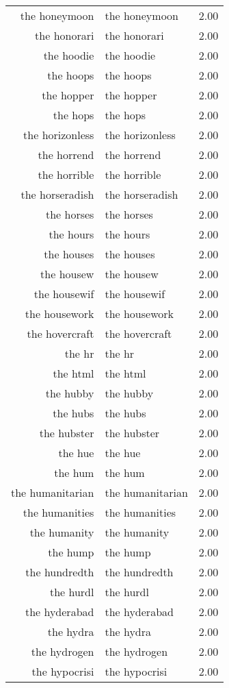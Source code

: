 \begin{table}[ht]
\begin{tabular}{rlr}
  the honeymoon & the honeymoon & 2.00 \\ 
  the honorari & the honorari & 2.00 \\ 
  the hoodie & the hoodie & 2.00 \\ 
  the hoops & the hoops & 2.00 \\ 
  the hopper & the hopper & 2.00 \\ 
  the hops & the hops & 2.00 \\ 
  the horizonless & the horizonless & 2.00 \\ 
  the horrend & the horrend & 2.00 \\ 
  the horrible & the horrible & 2.00 \\ 
  the horseradish & the horseradish & 2.00 \\ 
  the horses & the horses & 2.00 \\ 
  the hours & the hours & 2.00 \\ 
  the houses & the houses & 2.00 \\ 
  the housew & the housew & 2.00 \\ 
  the housewif & the housewif & 2.00 \\ 
  the housework & the housework & 2.00 \\ 
  the hovercraft & the hovercraft & 2.00 \\ 
  the hr & the hr & 2.00 \\ 
  the html & the html & 2.00 \\ 
  the hubby & the hubby & 2.00 \\ 
  the hubs & the hubs & 2.00 \\ 
  the hubster & the hubster & 2.00 \\ 
  the hue & the hue & 2.00 \\ 
  the hum & the hum & 2.00 \\ 
  the humanitarian & the humanitarian & 2.00 \\ 
  the humanities & the humanities & 2.00 \\ 
  the humanity & the humanity & 2.00 \\ 
  the hump & the hump & 2.00 \\ 
  the hundredth & the hundredth & 2.00 \\ 
  the hurdl & the hurdl & 2.00 \\ 
  the hyderabad & the hyderabad & 2.00 \\ 
  the hydra & the hydra & 2.00 \\ 
  the hydrogen & the hydrogen & 2.00 \\ 
  the hypocrisi & the hypocrisi & 2.00 \\ 

\end{tabular}
\end{table}
